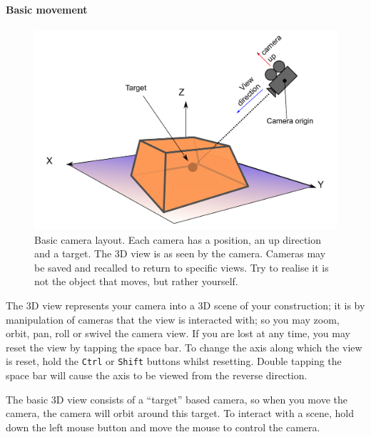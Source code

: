 \documentclass[10pt]{article}
\begin{document}
\paragraph{Basic movement}
\begin{figure}[ht]
\centering
 \includegraphics[width=0.7 \textwidth,keepaspectratio=true]{./figures/camera.pdf}

 \caption{Basic camera layout. Each camera has a position, an up direction and a target. The 3D view is as seen by the camera. Cameras may be saved and recalled to return to specific views. Try to realise it is not the object that moves, but rather yourself.}
\label{fig:camera-basics}
\end{figure}
The 3D view represents your camera into a 3D scene of your construction; it is by manipulation of cameras that the view is interacted with; so you may zoom, orbit, pan, roll or swivel the camera view. If you are lost at any time, you may reset the view by tapping the space bar. To change the axis along which the view is reset, hold the \texttt{Ctrl} or \texttt{Shift} buttons whilst resetting.  Double tapping the space bar will cause the axis to be viewed from the reverse direction.

The basic 3D view consists of a ``target'' based camera, so when you move the camera, the camera will orbit around this target. To interact with a scene, hold down the left mouse button and move the mouse to control the camera.  
\end{document}
